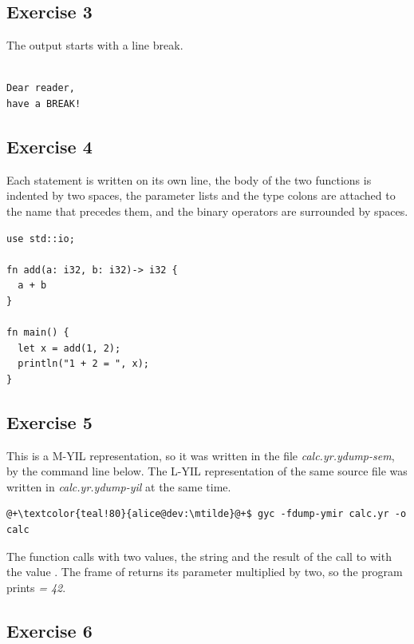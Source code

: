 \subsection*{Exercise 3}
The output starts with a line break.
\begin{lstlisting}[style=bashVerb]

Dear reader,
have a BREAK!
\end{lstlisting}

\subsection*{Exercise 4}

Each statement is written on its own line, the body of the two functions is
indented by two spaces, the parameter lists and the type colons are attached to
the name that precedes them, and the binary operators are surrounded by spaces.

\begin{lstlisting}[style=coloredverbatim, caption=Solution for exercise 4]
use std::io;

fn add(a: i32, b: i32)-> i32 {
  a + b
}

fn main() {
  let x = add(1, 2);
  println("1 + 2 = ", x);
}
\end{lstlisting}

\subsection*{Exercise 5}

This is a M-YIL representation, so it was written in the file
\textit{calc.yr.ydump-sem}, by the command line below. The L-YIL
representation of the same source file was written in \textit{calc.yr.ydump-yil}
at the same time.

\begin{lstlisting}[style=bashVerb, escapechar=@+]
@+\textcolor{teal!80}{alice@dev:\mtilde}@+$ gyc -fdump-ymir calc.yr -o calc
\end{lstlisting}

The  function calls  with two values, the string
 and the result of the call to  with the value
. The frame of  returns its parameter multiplied by two,
so the program prints \textit{= 42}.

\subsection*{Exercise 6}

